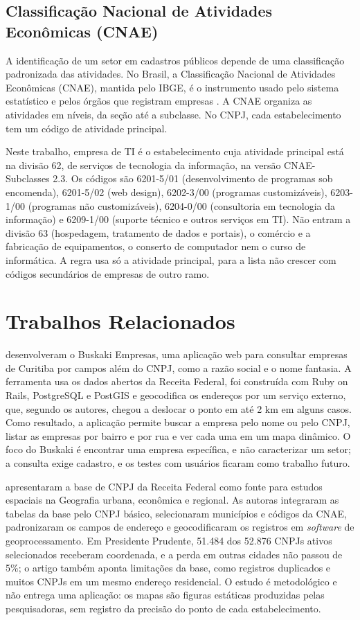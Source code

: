 \documentclass[a4paper,12pt]{article}
\begin{document}
\subsection{Classificação Nacional de Atividades Econômicas (CNAE)}

A identificação de um setor em cadastros públicos depende de uma classificação padronizada das atividades.
No Brasil, a Classificação Nacional de Atividades Econômicas (CNAE), mantida pelo IBGE, é o instrumento usado pelo sistema estatístico e pelos órgãos que registram empresas \cite{ibge2020}.
A CNAE organiza as atividades em níveis, da seção até a subclasse.
No CNPJ, cada estabelecimento tem um código de atividade principal.

Neste trabalho, empresa de TI é o estabelecimento cuja atividade principal está na divisão 62, de serviços de tecnologia da informação, na versão CNAE-Subclasses 2.3.
Os códigos são 6201-5/01 (desenvolvimento de programas sob encomenda), 6201-5/02 (web design), 6202-3/00 (programas customizáveis), 6203-1/00 (programas não customizáveis), 6204-0/00 (consultoria em tecnologia da informação) e 6209-1/00 (suporte técnico e outros serviços em TI).
Não entram a divisão 63 (hospedagem, tratamento de dados e portais), o comércio e a fabricação de equipamentos, o conserto de computador nem o curso de informática.
A regra usa só a atividade principal, para a lista não crescer com códigos secundários de empresas de outro ramo.

\section{Trabalhos Relacionados}

 desenvolveram o Buskaki Empresas, uma aplicação web para consultar empresas de Curitiba por campos além do CNPJ, como a razão social e o nome fantasia.
A ferramenta usa os dados abertos da Receita Federal, foi construída com Ruby on Rails, PostgreSQL e PostGIS e geocodifica os endereços por um serviço externo, que, segundo os autores, chegou a deslocar o ponto em até 2 km em alguns casos.
Como resultado, a aplicação permite buscar a empresa pelo nome ou pelo CNPJ, listar as empresas por bairro e por rua e ver cada uma em um mapa dinâmico.
O foco do Buskaki é encontrar uma empresa específica, e não caracterizar um setor; a consulta exige cadastro, e os testes com usuários ficaram como trabalho futuro.

 apresentaram a base de CNPJ da Receita Federal como fonte para estudos espaciais na Geografia urbana, econômica e regional.
As autoras integraram as tabelas da base pelo CNPJ básico, selecionaram municípios e códigos da CNAE, padronizaram os campos de endereço e geocodificaram os registros em \textit{software} de geoprocessamento.
Em Presidente Prudente, 51.484 dos 52.876 CNPJs ativos selecionados receberam coordenada, e a perda em outras cidades não passou de 5\%; o artigo também aponta limitações da base, como registros duplicados e muitos CNPJs em um mesmo endereço residencial.
O estudo é metodológico e não entrega uma aplicação: os mapas são figuras estáticas produzidas pelas pesquisadoras, sem registro da precisão do ponto de cada estabelecimento.
\end{document}
